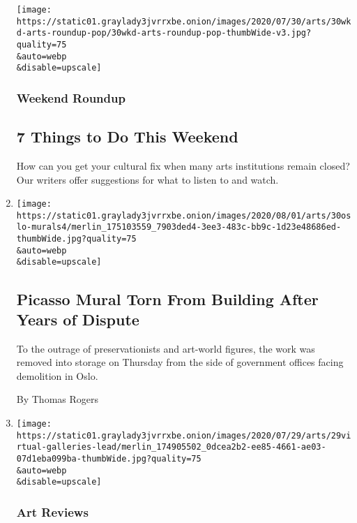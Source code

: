 \begin{enumerate}
  \texttt{[image: https://static01.graylady3jvrrxbe.onion/images/2020/07/30/arts/30wkd-arts-roundup-pop/30wkd-arts-roundup-pop-thumbWide-v3.jpg?quality=75\\\&auto=webp\\\&disable=upscale]}

  \hypertarget{weekend-roundup}{%
  \subsubsection{Weekend Roundup}\label{weekend-roundup}}

  \hypertarget{7-things-to-do-this-weekend}{%
  \subsection{7 Things to Do This
  Weekend}\label{7-things-to-do-this-weekend}}

  How can you get your cultural fix when many arts institutions remain
  closed? Our writers offer suggestions for what to listen to and watch.
\item
  \href{/2020/07/30/arts/design/picasso-fishermen-mural-norway.html}{}

  \texttt{[image: https://static01.graylady3jvrrxbe.onion/images/2020/08/01/arts/30oslo-murals4/merlin\_175103559\_7903ded4-3ee3-483c-bb9c-1d23e48686ed-thumbWide.jpg?quality=75\\\&auto=webp\\\&disable=upscale]}

  \hypertarget{picasso-mural-torn-from-building-after-years-of-dispute}{%
  \subsection{Picasso Mural Torn From Building After Years of
  Dispute}\label{picasso-mural-torn-from-building-after-years-of-dispute}}

  To the outrage of preservationists and art-world figures, the work was
  removed into storage on Thursday from the side of government offices
  facing demolition in Oslo.

  By Thomas Rogers
\item
  \href{/2020/07/30/arts/design/virtual-art-gallery-shows.html}{}

  \texttt{[image: https://static01.graylady3jvrrxbe.onion/images/2020/07/29/arts/29virtual-galleries-lead/merlin\_174905502\_0dcea2b2-ee85-4661-ae03-07d1eba099ba-thumbWide.jpg?quality=75\\\&auto=webp\\\&disable=upscale]}

  \hypertarget{art-reviews}{%
  \subsubsection{Art Reviews}\label{art-reviews}}


\end{enumerate}
